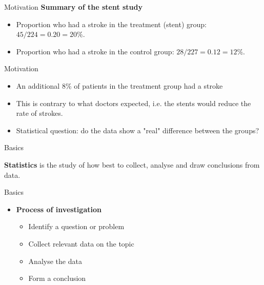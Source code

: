 \documentclass[12pt,a4paper]{beamer}
\begin{document}
\begin{frame}{Motivation}
\textbf{Summary of the stent study}
\begin{table}[h]
\centering
{}

\end{table}
\small\begin{itemize}
\setlength{\itemsep}{0mm}
\item Proportion who had a stroke in the treatment (stent) group: $45/224 = 0.20 = 20\%$.
\item Proportion who had a stroke in the control group: $28/227 = 0.12 = 12\%$.
\end{itemize}
\end{frame}
\begin{frame}{Motivation}
\begin{itemize}
\item An additional 8\% of patients in the treatment group had a stroke
\item This is contrary to what doctors expected, i.e. the stents would reduce the rate of strokes.
\item Statistical question: do the data show a "real" difference between the groups?
\end{itemize}

\end{frame}
\begin{frame}{Basics}
\begin{center}
\textbf{Statistics} is the study of how best to collect, analyse and draw conclusions from data.
\end{center}
\end{frame}
\begin{frame}{Basics}
\begin{itemize}
\item \textbf{Process of investigation}
\begin{itemize}
\item Identify a question or problem
\item Collect relevant data on the topic
\item Analyse the data
\item Form a conclusion
\end{itemize}
\end{itemize}
\end{frame}
\end{document}
